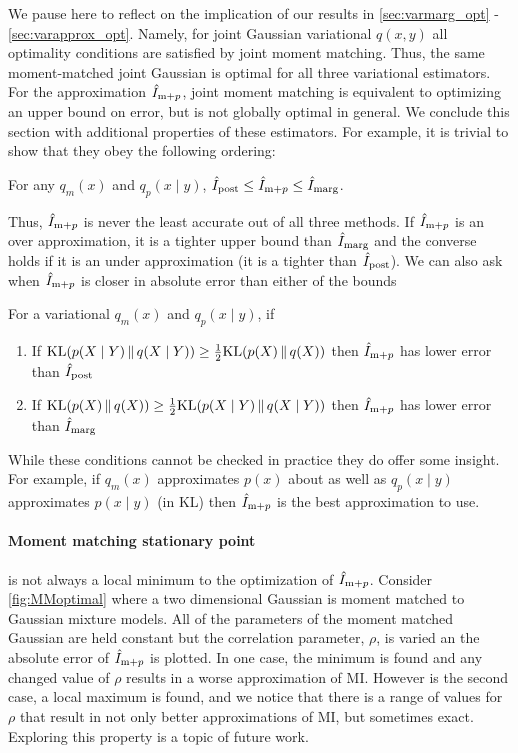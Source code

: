 We pause here to reflect on the implication of our results
in \SEC\ref{sec:varmarg_opt} - \ref{sec:varapprox_opt}.  Namely, for
joint Gaussian variational $q(x,y)$ all optimality conditions are
satisfied by joint moment matching.  Thus, the same moment-matched
joint Gaussian is optimal for all three variational estimators.  For
the approximation $\hat{I}_{\text{m}+p}$, joint moment matching is equivalent to
optimizing an upper bound on error, but is not globally optimal in
general.  We conclude this section with additional properties of these
estimators.  For example, it is trivial to show that they obey the
following ordering:
\begin{lemma}
  For any $q_m(x)$ and $q_p(x\mid y)$, $\hat{I}_{\text{post}}\leq\hat{I}_{\text{m}+p}\leq\hat{I}_{\text{marg}}$.
  \label{lemma:MIOrder}
\end{lemma}
Thus, $\hat{I}_{\text{m}+p}$ is never the least accurate out of all three methods. If
$\hat{I}_{\text{m}+p}$ is an over approximation, it is a tighter upper bound than
$\hat{I}_{\text{marg}}$ and the converse holds if it is an under approximation (it is
a tighter than $\hat{I}_{\text{post}}$). We can also ask when $\hat{I}_{\text{m}+p}$ is closer in
absolute error than either of the bounds
\begin{lemma}\label{lemma:AbsPostError}
  For a variational $q_m(x)$ and $q_p(x\mid y)$, if 
  \begin{enumerate}
    \item If $\mathrm{KL}(p(X\mid Y)\,\|\,q(X\mid Y))\geq \frac{1}{2}\mathrm{KL}(p(X)\,\|\,q(X))$ 
    then $\hat{I}_{\text{m}+p}$ has lower error than $\hat{I}_{\text{post}}$
    \item If $\mathrm{KL}(p(X)\,\|\,q(X))\geq \frac{1}{2}\mathrm{KL}(p(X\mid Y)\,\|\,q(X\mid Y))$ 
    then $\hat{I}_{\text{m}+p}$ has lower error than $\hat{I}_{\text{marg}}$
  \end{enumerate}
\end{lemma}
While these conditions cannot be checked in practice they do offer
some insight.  For example, if $q_m(x)$ approximates $p(x)$ about as
well as $q_p(x\mid y)$ approximates $p(x\mid y)$ (in KL) then $\hat{I}_{\text{m}+p}$ is the
best approximation to use.

\paragraph{Moment matching stationary point} is not always a local minimum to the 
optimization of $\hat{I}_{\text{m}+p}$. Consider \FIG\ref{fig:MMoptimal} where a two
dimensional Gaussian is moment matched to Gaussian mixture models. All
of the parameters of the moment matched Gaussian are held constant but
the correlation parameter, $\rho$, is varied an the absolute error of
$\hat{I}_{\text{m}+p}$ is plotted. In one case, the minimum is found and any changed
value of $\rho$ results in a worse approximation of MI. However is the
second case, a local maximum is found, and we notice that there is a
range of values for $\rho$ that result in not only better
approximations of MI, but sometimes exact.  Exploring this property is
a topic of future work.

